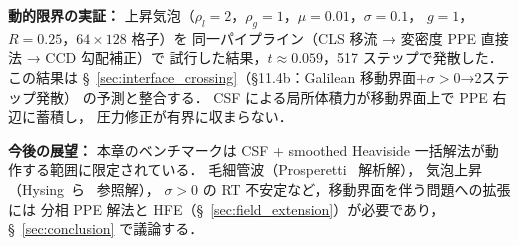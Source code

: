 \noindent\textbf{動的限界の実証：}
上昇気泡（$\rho_l = 2$，$\rho_g = 1$，$\mu = 0.01$，$\sigma = 0.1$，
$g = 1$，$R = 0.25$，$64 \times 128$ 格子）を
同一パイプライン（CLS 移流 → 変密度 PPE 直接法 → CCD 勾配補正）で
試行した結果，$t \approx 0.059$，517 ステップで発散した．
この結果は §~\ref{sec:interface_crossing}（§11.4b：Galilean 移動界面$+\sigma>0$→2ステップ発散）
の予測と整合する．
CSF による局所体積力が移動界面上で PPE 右辺に蓄積し，
圧力修正が有界に収まらない．

\noindent\textbf{今後の展望：}
本章のベンチマークは CSF + smoothed Heaviside 一括解法が動作する範囲に限定されている．
毛細管波（Prosperetti~\cite{Prosperetti1981} 解析解），
気泡上昇（Hysing~ら~\cite{Hysing2009} 参照解），
$\sigma > 0$ の RT 不安定など，移動界面を伴う問題への拡張には
分相 PPE 解法と HFE（§~\ref{sec:field_extension}）が必要であり，
§~\ref{sec:conclusion} で議論する．
